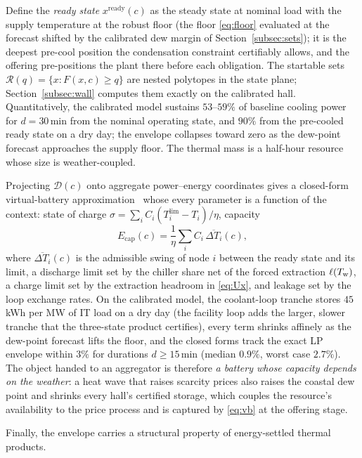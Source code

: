 Define the \emph{ready state} $x^{\mathrm{ready}}(c)$ as the steady state at
nominal load with the supply temperature at the robust floor (the floor
\eqref{eq:floor} evaluated at the forecast shifted by the calibrated dew
margin of Section~\ref{subsec:sets}); it is the deepest pre-cool position the
condensation constraint certifiably allows, and the offering pre-positions
the plant there before each obligation. The startable sets
$\mathcal{R}(q)=\{x:F(x,c)\ge q\}$ are nested polytopes in the state plane;
Section~\ref{subsec:wall} computes them exactly on the calibrated hall.
Quantitatively, the calibrated model sustains $53$--$59\%$ of baseline
cooling power for $d=30$\,min from the nominal operating state, and $90\%$
from the pre-cooled ready state on a dry day; the envelope collapses toward
zero as the dew-point forecast approaches the supply floor. The thermal mass
is a half-hour resource whose size is weather-coupled.

Projecting $\mathcal{D}(c)$ onto aggregate power--energy coordinates gives a
closed-form virtual-battery approximation~\cite{hao2015aggregate} whose
every parameter is a function of the context: state of charge
$\sigma = \sum_i C_i (T_i^{\lim} - T_i)/\eta$, capacity
\begin{equation}
E_{\mathrm{cap}}(c) = \frac{1}{\eta}\sum_i C_i\,\overline{\Delta T_i}(c),
\label{eq:vb}
\end{equation}
where $\overline{\Delta T_i}(c)$ is the admissible swing of node $i$ between
the ready state and its limit, a discharge limit set by the chiller share
net of the forced extraction $\ell(\Tw)$, a charge limit set by the
extraction headroom in \eqref{eq:Ux}, and leakage set by the loop exchange
rates. On the calibrated model, the coolant-loop tranche stores $45$\,kWh
per MW of IT load on a dry day (the facility loop adds the larger, slower
tranche that the three-state product certifies), every term shrinks affinely
as the dew-point forecast lifts the floor, and the closed forms track the
exact LP envelope within $3\%$ for durations $d\ge 15$\,min (median
$0.9\%$, worst case $2.7\%$). The object handed to an aggregator is
therefore \emph{a battery whose capacity depends on the weather}: a heat
wave that raises scarcity prices also raises the coastal dew point and
shrinks every hall's certified storage, which couples the resource's
availability to the price process and is captured by \eqref{eq:vb} at the
offering stage.

Finally, the envelope carries a structural property of energy-settled thermal
products.

